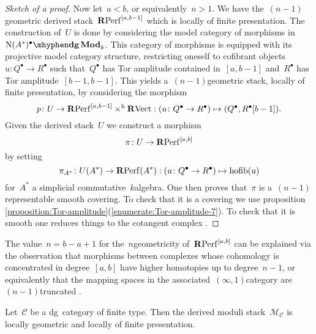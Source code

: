 \begin{refsection}
\begin{theorem}
\begin{proof}[Sketch of a proof]
    Now let~$a<b$, or equivalently~$n>1$. We have the~$(n-1)$\dash geometric derived stack~$\mathbf{R}\mathrm{Perf}^{[a,b-1]}$ which is locally of finite presentation. The construction of~$U$ is done by considering the model category of morphisms in~$\dgMod{\nerve(A^*)^\bullet}_k$. This category of morphisms is equipped with its projective model category structure, restricting oneself to cofibrant objects~$u\colon Q^\bullet\to R^\bullet$ such that~$Q^\bullet$ has Tor amplitude contained in~$[a,b-1]$ and~$R^\bullet$ has Tor amplitude~$[b-1,b-1]$. This yields a~$(n-1)$\dash geometric stack, locally of finite presentation, by considering the morphism
    \begin{equation}
      p\colon U\to\mathbf{R}\mathrm{Perf}^{[a,b-1]}\times^{\mathrm{h}}\mathbf{R}\mathrm{Vect}:(u\colon Q^\bullet\to R^\bullet)\mapsto(Q^\bullet,R^\bullet[b-1]).
    \end{equation}
    Given the derived stack~$U$ we construct a morphism
    \begin{equation}
      \pi\colon U\to\mathbf{R}\mathrm{Perf}^{[a,b]}
    \end{equation}
    by setting
    \begin{equation}
      \pi_{A^*}\colon U(A^*)\to\mathbf{R}\mathrm{Perf}(A^*):(u\colon Q^\bullet\to R^\bullet)\mapsto\operatorname{hofib}(u)
    \end{equation}
    for~$A^*$ a simplicial commutative~$k$\dash algebra. One then proves that~$\pi$ is a~$(n-1)$\dash representable smooth covering. To check that it is a covering we use proposition \ref{proposition:Tor-amplitude}(\ref{enumerate:Tor-amplitude-7}). To check that it is smooth one reduces things to the cotangent complex \cite[corollary 2.2.5.3]{toen-vezzosi-hag-II}.
  \end{proof}
\end{theorem}

\begin{remark}
  The value~$n=b-a+1$ for the~$n$\dash geometricity of~$\mathbf{R}\mathrm{Perf}^{[a,b]}$ can be explained via the observation that morphisms between complexes whose cohomology is concentrated in degree~$[a,b]$ have higher homotopies up to degree~$n-1$, or equivalently that the mapping spaces in the associated~$(\infty,1)$\dash category are~$(n-1)$\dash truncated \cite[\S3.3]{toen-derived-algebraic-geometry}.
\end{remark}

\begin{theorem}
  \label{theorem:main-theorem}
  Let~$\mathcal{C}$ be a dg~category of finite type. Then the derived moduli stack~$\mathcal{M}_{\mathcal{C}}$ is locally geometric and locally of finite presentation.


\end{theorem}
\end{refsection}
